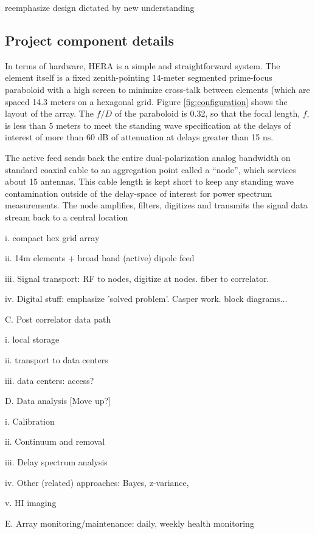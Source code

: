 \documentclass[preprint]{aastex}
\begin{document}
reemphasize design dictated by new understanding

\subsection{Project component details}  %
In terms of hardware, HERA is a simple and straightforward system.  The element
itself is a fixed zenith-pointing 14-meter segmented prime-focus paraboloid with a high screen
to minimize cross-talk between elements (which are spaced 14.3 meters on a
hexagonal grid.  Figure \ref{fig:configuration} shows the layout of the array.  The $f/D$ of
the paraboloid is 0.32, so that the focal length, $f$, is less than 5 meters to meet the 
standing wave specification at the delays of interest of more than 60 dB of attenuation at delays 
greater than 15 ns.

The active feed sends back the entire dual-polarization analog bandwidth on standard
coaxial cable to an aggregation point called a ``node'', which services 
about 15 antennas.  This cable length is kept short to keep any standing
wave contamination outside of the delay-space of interest for power spectrum
measurements.  The node amplifies, filters, digitizes and transmits the signal data stream
back to a central location 

i. compact hex grid array

ii. 14m elements + broad band (active) dipole feed

iii. Signal transport: RF to nodes, digitize at nodes. fiber to correlator. 

iv. Digital stuff: emphasize 'solved problem'. Casper work. block diagrams...

C. Post correlator data path

i. local storage

ii. transport to data centers

iii. data centers: access? 

D. Data analysis [Move up?]

i. Calibration 

ii. Continuum and removal

iii. Delay spectrum analysis

iv. Other (related) approaches: Bayes, z-variance,

v. HI imaging

E. Array monitoring/maintenance: daily, weekly health monitoring
\end{document}
